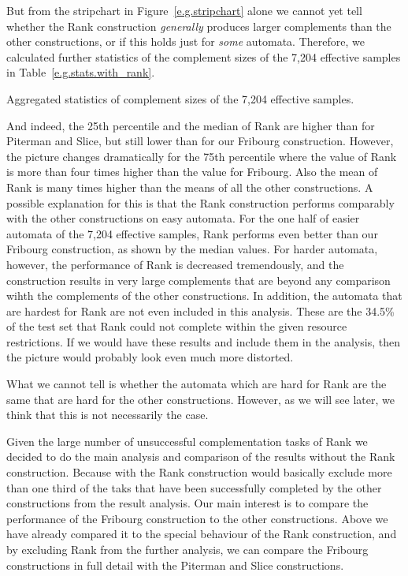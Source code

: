 But from the stripchart in Figure~\ref{e.g.stripchart} alone we cannot yet tell whether the Rank construction \textit{generally} produces larger complements than the other constructions, or if this holds just for \textit{some} automata. Therefore, we calculated further statistics of the complement sizes of the 7,204 effective samples in Table~\ref{e.g.stats.with_rank}. 

\begin{table}[ht]
\centering

\caption{Aggregated statistics of complement sizes of the 7,204 effective samples.}
\label{e.g.stats.with_rank}
\end{table}

And indeed, the 25th percentile and the median of Rank are higher than for Piterman and Slice, but still lower than for our Fribourg construction. However, the picture changes dramatically for the 75th percentile where the value of Rank is more than four times higher than the value for Fribourg. Also the mean of Rank is many times higher than the means of all the other constructions. A possible explanation for this is that the Rank construction performs comparably with the other constructions on easy automata. For the one half of easier automata of the 7,204 effective samples, Rank performs even better than our Fribourg construction, as shown by the median values. For harder automata, however, the performance of Rank is decreased tremendously, and the construction results in very large complements that are beyond any comparison wihth the complements of the other constructions. In addition, the automata that are hardest for Rank are not even included in this analysis. These are the 34.5\% of the test set that Rank could not complete within the given resource restrictions. If we would have these results and include them in the analysis, then the picture would probably look even much more distorted.

What we cannot tell is whether the automata which are hard for Rank are the same that are hard for the other constructions. However, as we will see later, we think that this is not necessarily the case.

Given the large number of unsuccessful complementation tasks of Rank we decided to do the main analysis and comparison of the results without the Rank construction. Because with the Rank construction would basically exclude more than one third of the taks that have been successfully completed by the other constructions from the result analysis. Our main interest is to compare the performance of the Fribourg construction to the other constructions. Above we have already compared it to the special behaviour of the Rank construction, and by excluding Rank from the further analysis, we can compare the Fribourg constructions in full detail with the Piterman and Slice constructions.

